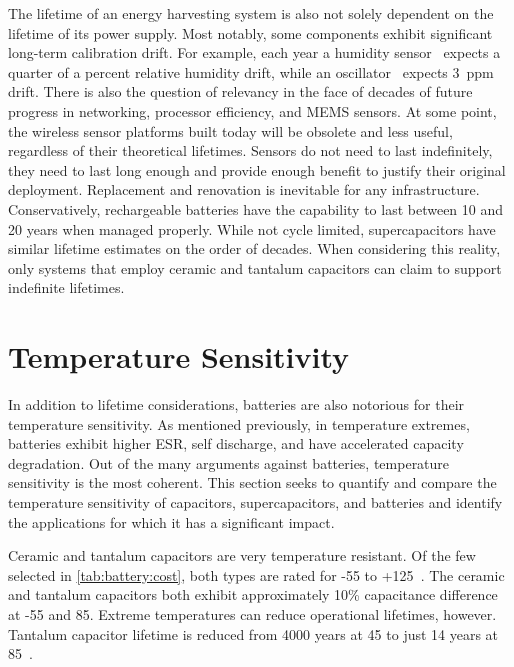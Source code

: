 The lifetime of an energy harvesting system is also not solely dependent on the lifetime of its power supply.
Most notably, some components exhibit significant long-term calibration drift. For example, each year a humidity sensor~\cite{si7021} expects a quarter of a percent relative humidity drift, while an oscillator~\cite{txc-oscillator} expects 3~ppm drift.
There is also the question of relevancy in the face of decades of future
progress in networking, processor efficiency, and MEMS sensors. At some point, the wireless sensor platforms built today
will be obsolete and less useful, regardless of their theoretical lifetimes. Sensors do not need to last indefinitely, they need to last long enough and provide enough
benefit to justify their original deployment. Replacement and renovation is inevitable for any infrastructure.
Conservatively, rechargeable batteries have the capability to last between 10 and 20 years when managed properly. While not cycle limited, supercapacitors have similar lifetime estimates on the order of decades. 
When considering this reality, only systems that employ ceramic and tantalum capacitors can claim to support indefinite lifetimes. 

\section{Temperature Sensitivity}
In addition to lifetime considerations, batteries are also notorious for their temperature sensitivity. As mentioned previously, in temperature extremes, batteries exhibit higher ESR, self discharge, and have accelerated capacity degradation. Out of the many arguments against batteries, temperature sensitivity is the most coherent. This section seeks to quantify and compare the temperature sensitivity of capacitors, supercapacitors, and batteries and identify the applications for which it has a significant impact.

Ceramic and tantalum capacitors are very temperature resistant. Of the few selected in \cref{tab:battery:cost}, both types are rated for -55 to +125\ssi{\celsius}~\cite{ceramicDatasheet,ceramicDatasheet2,tantalumDatasheet}. The ceramic and tantalum capacitors both exhibit approximately 10\% capacitance difference at -55 and 85\ssi{\celsius}. Extreme temperatures can reduce operational lifetimes, however. 
Tantalum capacitor lifetime is reduced from 4000 years at 45\ssi{\celsius} to just 14 years at 85\ssi{\celsius}~\cite{kemetLife}.

